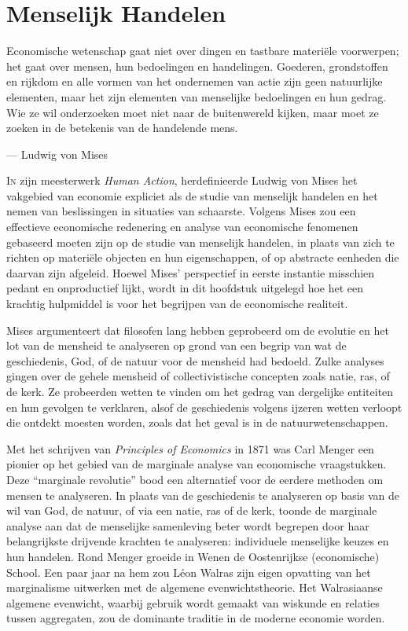 \chapter{Menselijk Handelen}

\begin{blockquotebox}
    Economische wetenschap gaat niet over dingen en tastbare materiële voorwerpen; het gaat over mensen, hun bedoelingen en handelingen. Goederen, grondstoffen en rijkdom en alle vormen van het ondernemen van actie zijn geen natuurlijke elementen, maar het zijn elementen van menselijke bedoelingen en hun gedrag. Wie ze wil onderzoeken moet niet naar de buitenwereld kijken, maar moet ze zoeken in de betekenis van de handelende mens.\footnotemark \par\raggedleft--- Ludwig von Mises
\end{blockquotebox}

\noindent \lettrine{I}n zijn meesterwerk \textit{Human Action}, herdefinieerde Ludwig von Mises het vakgebied van economie expliciet als de studie van menselijk handelen en het nemen van beslissingen in situaties van schaarste. Volgens Mises zou een effectieve economische redenering en analyse van economische fenomenen gebaseerd moeten zijn op de studie van menselijk handelen, in plaats van zich te richten op materiële objecten en hun eigenschappen, of op abstracte eenheden die daarvan zijn afgeleid. Hoewel Mises' perspectief in eerste instantie misschien pedant en onproductief lijkt, wordt in dit hoofdstuk uitgelegd hoe het een krachtig hulpmiddel is voor het begrijpen van de economische realiteit.

Mises argumenteert dat filosofen lang hebben geprobeerd om de evolutie en het lot van de mensheid te analyseren op grond van een begrip van wat de geschiedenis, God, of de natuur voor de mensheid had bedoeld. Zulke analyses gingen over de gehele mensheid of collectivistische concepten zoals natie, ras, of de kerk. Ze probeerden wetten te vinden om het gedrag van dergelijke entiteiten en hun gevolgen te verklaren, alsof de geschiedenis volgens ijzeren wetten verloopt die ontdekt moesten worden, zoals dat het geval is in de natuurwetenschappen.

Met het schrijven van \textit{Principles of Economics} in 1871 was Carl Menger een pionier op het gebied van de marginale analyse van economische vraagstukken. Deze “marginale revolutie” bood een alternatief voor de eerdere methoden om mensen te analyseren. In plaats van de geschiedenis te analyseren op basis van de wil van God, de natuur, of via een natie, ras of de kerk, toonde de marginale analyse aan dat de menselijke samenleving beter wordt begrepen door haar belangrijkste drijvende krachten te analyseren: individuele menselijke keuzes en hun handelen. Rond Menger groeide in Wenen de Oostenrijkse (economische) School. Een paar jaar na hem zou Léon Walras zijn eigen opvatting van het marginalisme uitwerken met de algemene evenwichtstheorie. Het Walrasiaanse algemene evenwicht, waarbij gebruik wordt gemaakt van wiskunde en relaties tussen aggregaten, zou de dominante traditie in de moderne economie worden.

